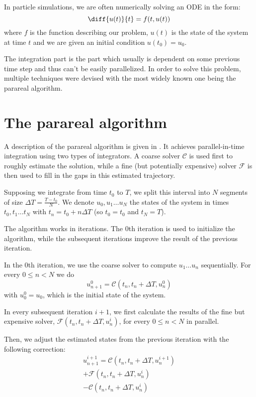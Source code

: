 \documentclass[conference]{IEEEtran}
\begin{document}
In particle simulations, we are often numerically solving an ODE in the form:
$$
\diff{u(t)}{t} = f(t, u(t))
$$
where $f$ is the function describing our problem, $u(t)$ is the state of the system at time $t$ and we are given an initial condition $u(t_0) = u_0$.

The integration part is the part which usually is dependent on some previous time step and thus can't be easily parallelized. In order to solve this problem, multiple techniques were devised with the most widely known one being the parareal algorithm.

\section{The parareal algorithm}

A description of the parareal algorithm is given in \cite{parareal}. It achieves parallel-in-time integration using two types of integrators. A coarse solver $\mathcal{C}$ is used first to roughly estimate the solution, while a fine (but potentially expensive) solver $\mathcal{F}$ is then used to fill in the gaps in this estimated trajectory.

Supposing we integrate from time $t_0$ to $T$, we split this interval into $N$ segments of size $\Delta T = \frac{T-t_0}{N}$. We denote $u_0, u_1\dots u_N$ the states of the system in times $t_0, t_1\dots t_N$ with $t_n = t_0 + n\Delta T$ (so $t_0 = t_0$ and $t_N = T$).

The algorithm works in iterations. The 0th iteration is used to initialize the algorithm, while the subsequent iterations improve the result of the previous iteration.

In the 0th iteration, we use the coarse solver to compute $u_1\dots u_n$ sequentially. For every $0 \leq n < N$ we do
$$
u^0_{n+1} = \mathcal{C}(t_n, t_n+\Delta T, u^0_n)
$$
with $u^0_0 = u_0$, which is the initial state of the system.

In every subsequent iteration $i+1$, we first calculate the results of the fine but expensive solver, $\mathcal{F}(t_n, t_n+\Delta T, u^{i}_n)$, for every $0 \leq n < N$ in parallel.

Then, we adjust the estimated states from the previous iteration with the following correction:
\begin{multline}
u^{i+1}_{n+1} = \mathcal{C}(t_n, t_n+\Delta T, u^{i+1}_n)\\ + \mathcal{F}(t_n, t_n+\Delta T, u^i_n)\\ - \mathcal{C}(t_n, t_n+\Delta T, u^{i}_n)
\end{multline}
\end{document}
